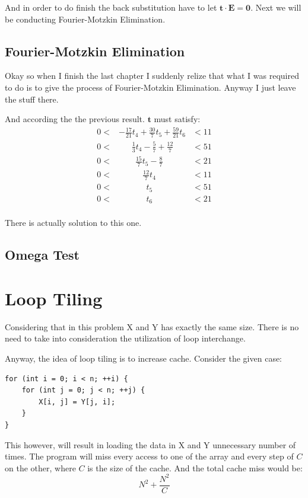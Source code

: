 \documentclass[12pt]{article}
\begin{document}
And in order to do finish the back substitution have to let
$\pmb{t\cdot E = 0}$. Next we will be conducting Fourier-Motzkin
Elimination.

\subsection{Fourier-Motzkin Elimination}
Okay so when I finish the last chapter I suddenly relize that what I
was required to do is to give the process of Fourier-Motzkin
Elimination. Anyway I just leave the stuff there.

And according the the previous result. $\pmb{t}$ must satisfy:
\begin{equation}
  \begin{aligned}
    0 <& -\frac{17}{21}t_4 + \frac{30}{7}t_5 + \frac{59}{21}t_6 &< 11 \\
    0 <& ~~~~~~~\frac{1}{3}t_4 - \frac{5}{7} + \frac{12}{7} &< 51 \\
0 <&~~~~~~~~~\frac{15}{7}t_5 - \frac{8}{7}  &< 21 \\
0 <& ~~~~~~~~~~~~~\frac{12}{7}t_4   &<  11 \\
0 <& ~~~~~~~~~~~~~~~t_5 &< 51 \\
0 <& ~~~~~~~~~~~~~~~ t_6 &< 21 \\
  \end{aligned}
\end{equation}

There is actually solution to this one.


\subsection{Omega Test}



\section{Loop Tiling}

Considering that in this problem X and Y has exactly the same size. There is no need to take into consideration
the utilization of loop interchange.

Anyway, the idea of loop tiling is to increase cache. 
Consider the given case:
\begin{verbatim}
for (int i = 0; i < n; ++i) {
    for (int j = 0; j < n; ++j) {
        X[i, j] = Y[j, i];
    }
}

\end{verbatim}
This however, will result in loading the data in X and Y 
unnecessary number of times. The program will miss every access to one
of the array and every step of $C$ on the other, where $C$ is the size
of the cache. And the total cache miss would be: $$N^2+\frac{N^2}{C}$$
\end{document}
